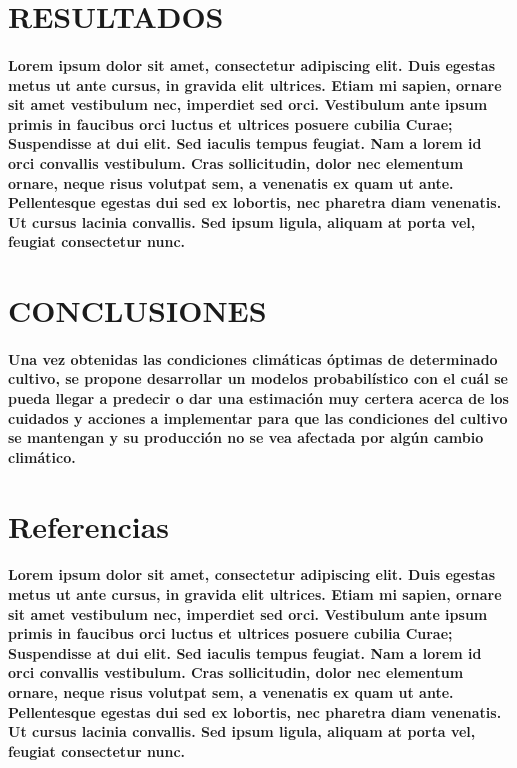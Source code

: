 \documentclass[10pt, twocolumn]{article}
\begin{document}
\section{RESULTADOS}
\paragraph{Lorem ipsum dolor sit amet, consectetur adipiscing elit. Duis egestas metus ut ante cursus, in gravida elit ultrices. Etiam mi sapien, ornare sit amet vestibulum nec, imperdiet sed orci. Vestibulum ante ipsum primis in faucibus orci luctus et ultrices posuere cubilia Curae; Suspendisse at dui elit. Sed iaculis tempus feugiat. Nam a lorem id orci convallis vestibulum. Cras sollicitudin, dolor nec elementum ornare, neque risus volutpat sem, a venenatis ex quam ut ante. Pellentesque egestas dui sed ex lobortis, nec pharetra diam venenatis. Ut cursus lacinia convallis. Sed ipsum ligula, aliquam at porta vel, feugiat consectetur nunc.}

\section{CONCLUSIONES}
\paragraph{Una vez obtenidas las condiciones climáticas óptimas de determinado cultivo, se propone desarrollar un modelos probabilístico con el cuál se pueda llegar a predecir o dar una estimación muy certera acerca de los cuidados y acciones a implementar para que las condiciones del cultivo se mantengan y su producción no se vea afectada por algún cambio climático.}

\section*{Referencias}
\paragraph{Lorem ipsum dolor sit amet, consectetur adipiscing elit. Duis egestas metus ut ante cursus, in gravida elit ultrices. Etiam mi sapien, ornare sit amet vestibulum nec, imperdiet sed orci. Vestibulum ante ipsum primis in faucibus orci luctus et ultrices posuere cubilia Curae; Suspendisse at dui elit. Sed iaculis tempus feugiat. Nam a lorem id orci convallis vestibulum. Cras sollicitudin, dolor nec elementum ornare, neque risus volutpat sem, a venenatis ex quam ut ante. Pellentesque egestas dui sed ex lobortis, nec pharetra diam venenatis. Ut cursus lacinia convallis. Sed ipsum ligula, aliquam at porta vel, feugiat consectetur nunc.}
\end{document}

